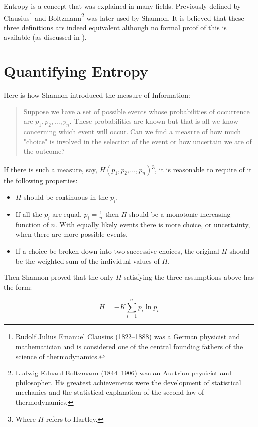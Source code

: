 \documentclass[12pt, a4paper]{report}
\begin{document}
Entropy is a concept that was explained in many fields. Previously defined by Clausius\footnote{Rudolf Julius Emanuel Clausius
(1822–1888) was a German physicist and mathematician and is considered one of the central founding fathers of the science of
thermodynamics.} and Boltzmann\footnote{Ludwig Eduard Boltzmann (1844–1906) was an Austrian physicist and philosopher. His
greatest achievements were the development of statistical mechanics and the statistical explanation of the second law of
thermodynamics.} was later used by Shannon. It is believed that these three definitions are indeed equivalent although no formal
proof of this is available (as discussed in \cite{EntropyAndInformationTheoryUsesAndMisuses}).

\section{Quantifying Entropy}

Here is how Shannon introduced the measure of Information:
\begin{quote}
Suppose we have a set of possible events whose probabilities of occurrence are \(p_1, p_2, \dots, p_n\). These probabilities are
known but that is all we know concerning which event will occur. Can we find a measure of how much "choice" is involved in the
selection of the event or how uncertain we are of the outcome?
\end{quote}
If there is such a measure, say, \(H(p_1, p_2, \dots, p_n)\)\footnote{Where \(H\) refers to Hartley.}, it is reasonable to require
of it the following properties:
\begin{itemize}
  \item \(H\) should be continuous in the \(p_i\).
  \item If all the \(p_i\) are equal, \(p_i = \frac{1}{n}\) then \(H\) should be a monotonic increasing function of \(n\). With
  equally likely events there is more choice, or uncertainty, when there are more possible events.
  \item If a choice be broken down into two successive choices, the original \(H\) should be the weighted sum of the individual
  values of \(H\).
\end{itemize}

Then Shannon proved that the only \(H\) satisfying the three assumptions above has the form:

\begin{equation} \label{eq:entropy1}
  H = -K \sum_{i = 1}^{n} p_i \ln p_i
\end{equation}
\end{document}
